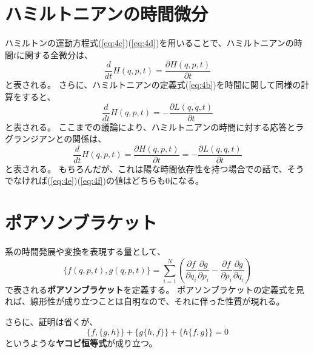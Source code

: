 \documentclass[a4paper]{jsreport}
\begin{document}
        \section{ハミルトニアンの時間微分}
            ハミルトンの運動方程式(\ref{eq:4c})(\ref{eq:4d})を用いることで、ハミルトニアンの時間$t$に関する全微分は、
            \begin{equation} \label{eq:4e}
                \frac{d}{dt} H(q, p ,t) = \frac{\partial H(q, p, t)}{\partial t}
            \end{equation}
            と表される。
            さらに、ハミルトニアンの定義式(\ref{eq:4b})を時間に関して同様の計算をすると、
            \begin{equation} \label{eq:4f}
                \frac{d}{dt} H(q, p ,t) = - \frac{\partial L(q, \dot{q}, t)}{\partial t}
            \end{equation}
            と表される。
            ここまでの議論により、ハミルトニアンの時間に対する応答とラグランジアンとの関係は、
            \begin{equation}
                \frac{d}{dt} H(q, p ,t) = \frac{\partial H(q, p, t)}{\partial t} = - \frac{\partial L(q, \dot{q}, t)}{\partial t}
            \end{equation}
            と表される。
            もちろんだが、これは陽な時間依存性を持つ場合での話で、そうでなければ(\ref{eq:4e})(\ref{eq:4f})の値はどちらも$0$になる。
       
        \section{ポアソンブラケット}
            系の時間発展や変換を表現する量として、
            \begin{equation}
                \{f(q, p, t), g(q, p, t)\} = \sum_{i=1}^N \left(\frac{\partial f}{\partial q_i}\frac{\partial g}{\partial p_i} - \frac{\partial f}{\partial p_i}\frac{\partial g}{\partial q_i}\right)
            \end{equation}
            で表される\textbf{ポアソンブラケット}を定義する。
            ポアソンブラケットの定義式を見れば、線形性が成り立つことは自明なので、それに伴った性質が現れる。\par
            さらに、証明は省くが、
            \begin{equation}
                \{ f, \{ g, h \} \} + \{ g \{ h, f \} \} + \{ h \{ f, g \} \} = 0
            \end{equation}
            というような\textbf{ヤコビ恒等式}が成り立つ。
\end{document}
